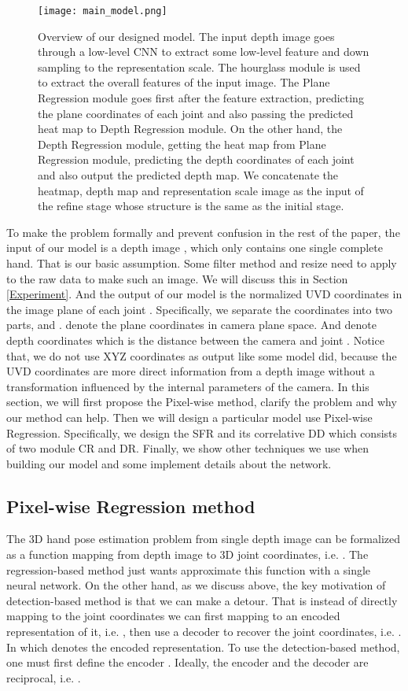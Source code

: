 \documentclass[journal]{IEEEtran}
\begin{document}
\begin{figure*}[!t]
  \centering
  \texttt{[image: main\_model.png]}
  \caption{
  Overview of our designed model. 
  The input depth image goes through a low-level CNN to extract some low-level feature and down sampling to the representation scale. 
  The hourglass module is used to extract the overall features of the input image. 
  The Plane Regression module goes first after the feature extraction, 
  predicting the plane coordinates of each joint and also passing the predicted heat map to Depth Regression module. 
  On the other hand, the Depth Regression module, getting the heat map from Plane Regression module, 
  predicting the depth coordinates of each joint and also output the predicted depth map. 
  We concatenate the heatmap, depth map and representation scale image as the input of the refine stage whose structure is the same as the initial stage.
  }
  \label{model}
\end{figure*}

To make the problem formally and prevent confusion in the rest of the paper,   
the input of our model is a depth image , 
which only contains one single complete hand. 
That is our basic assumption. 
Some filter method and resize need to apply to the raw data to make such an image. 
We will discuss this in Section \ref{Experiment}. 
And the output of our model is the normalized UVD coordinates in the image plane of each joint . 
Specifically, we separate the coordinates into two parts,  and .
 denote the plane coordinates in camera plane space. 
And  denote depth coordinates which is the distance between the camera and joint . 
Notice that, we do not use XYZ coordinates as output like some model did, 
because the UVD coordinates are more direct information from a depth image without a transformation influenced by the internal parameters of the camera. 
In this section, we will first propose the Pixel-wise method, clarify the problem and why our method can help. 
Then we will design a particular model use Pixel-wise Regression. 
Specifically, we design the SFR and its correlative DD which consists of two module CR and DR. 
Finally, we show other techniques we use when building our model and some implement details about the network.

\subsection{Pixel-wise Regression method}

The 3D hand pose estimation problem from single depth image can be formalized as a function mapping from depth image to 3D joint coordinates, i.e. . 
The regression-based method just wants approximate this function with a single neural network. 
On the other hand, as we discuss above, the key motivation of detection-based method is that we can make a detour. 
That is instead of directly mapping to the joint coordinates we can first mapping to an encoded representation of it, i.e. , 
then use a decoder to recover the joint coordinates, i.e. . 
In which  denotes the encoded representation. 
To use the detection-based method, one must first define the encoder . 
Ideally, the encoder and the decoder are reciprocal, i.e. . 
\end{document}
